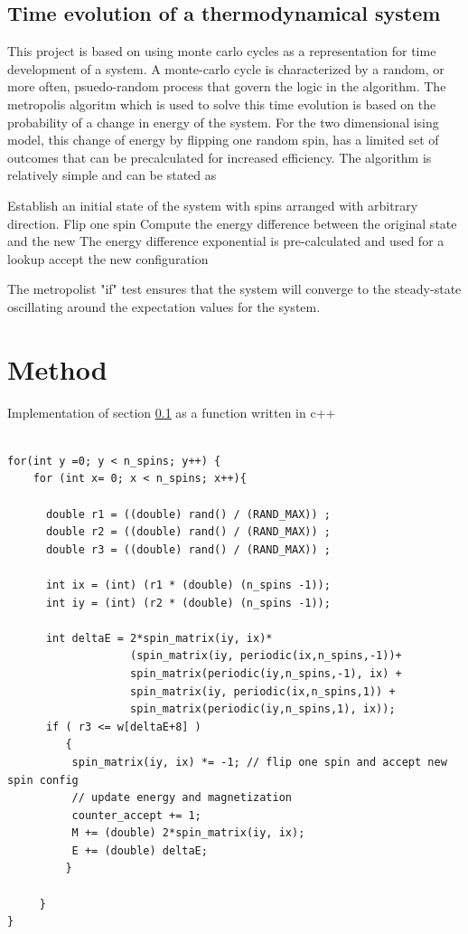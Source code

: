 \documentclass[12pt]{article}
\begin{document}
\subsection{Time evolution of a thermodynamical system}\label{sec:prog_theor}

This project is based on using monte carlo cycles as a representation for time development of a system. A monte-carlo cycle is characterized by a random, or more often, psuedo-random process that govern the logic in the algorithm. The metropolis algoritm which is used to solve this time evolution is based on the probability of  a change in energy of the system. For the two dimensional ising model, this change of energy by flipping one random spin, has a limited set  of outcomes that can be precalculated for increased efficiency. The algorithm is relatively simple and can be stated as \\
\begin{algorithmic}
\Require Establish an initial state of the system with spins arranged with arbitrary direction.
	\State Flip one spin 
	\State Compute the energy difference between the original state and the new
	\Comment The energy difference exponential is pre-calculated and used for a lookup
	\State accept the new configuration
	\EndIf
\EndFor
\end{algorithmic}

The metropolist "if" test ensures that the system will converge to the steady-state oscillating around the expectation values for the system.
\section*{Method}

Implementation of section \ref{sec:prog_theor} as a function written in c++

\begin{lstlisting}

for(int y =0; y < n_spins; y++) {
    for (int x= 0; x < n_spins; x++){

      double r1 = ((double) rand() / (RAND_MAX)) ;
      double r2 = ((double) rand() / (RAND_MAX)) ;
      double r3 = ((double) rand() / (RAND_MAX)) ;

      int ix = (int) (r1 * (double) (n_spins -1));
      int iy = (int) (r2 * (double) (n_spins -1));

      int deltaE = 2*spin_matrix(iy, ix)*
                   (spin_matrix(iy, periodic(ix,n_spins,-1))+
                   spin_matrix(periodic(iy,n_spins,-1), ix) +
                   spin_matrix(iy, periodic(ix,n_spins,1)) +
                   spin_matrix(periodic(iy,n_spins,1), ix));
      if ( r3 <= w[deltaE+8] )
         {
          spin_matrix(iy, ix) *= -1; // flip one spin and accept new spin config
          // update energy and magnetization
          counter_accept += 1;
          M += (double) 2*spin_matrix(iy, ix);
          E += (double) deltaE;
         }

     }
}
\end{lstlisting}
\end{document}

